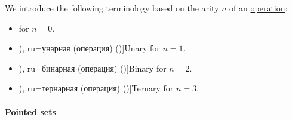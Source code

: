\begin{definition}\label{def:operation_arity_terminology}
  We introduce the following terminology based on the arity \( n \) of an \hyperref[def:operation_on_set]{operation}:
  \begin{itemize}
    \item {} for \( n = 0 \).
    \item \term[bg=унарна (операция) (\cite[75]{ГеновМиховскиМоллов1991Алгебра}), ru=унарная (операция) (\cite[def. 1.4]{Эдельман1975Логика})]{Unary} for \( n = 1 \).
    \item \term[bg=бинарна (операция) (\cite[def. IV.1]{ГеновМиховскиМоллов1991Алгебра}), ru=бинарная (операция) (\cite[def. 1.4]{Эдельман1975Логика})]{Binary} for \( n = 2 \).
    \item \term[bg=тернарна (операция) (\cite[75]{ГеновМиховскиМоллов1991Алгебра}), ru=тернарная (операция) (\cite[def. 1.4]{Эдельман1975Логика})]{Ternary} for \( n = 3 \).
  \end{itemize}
\end{definition}

\paragraph{Pointed sets}

